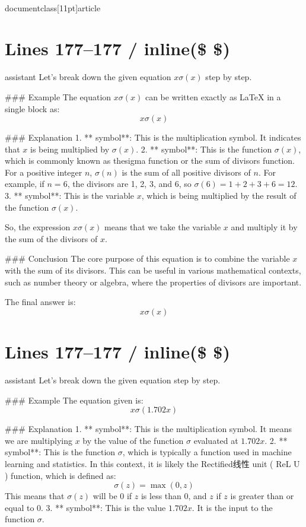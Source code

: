 \\documentclass[11pt]{article}
\begin{document}


\section*{Lines 177–177 / inline(\$ \$) }
assistant
Let's break down the given equation \( x \sigma(x) \) step by step.

### Example
The equation \( x \sigma(x) \) can be written exactly as LaTeX in a single block as:
\[ x \sigma(x) \]

### Explanation
1. ** symbol**: This is the multiplication symbol. It indicates that \( x \) is being multiplied by \( \sigma(x) \).
2. ** symbol**: This is the function \( \sigma(x) \), which is commonly known as thesigma function or the sum of divisors function. For a positive integer \( n \), \( \sigma(n) \) is the sum of all positive divisors of \( n \). For example, if \( n = 6 \), the divisors are 1, 2, 3, and 6, so \( \sigma(6) = 1 + 2 + 3 + 6 = 12 \).
3. ** symbol**: This is the variable \( x \), which is being multiplied by the result of the function \( \sigma(x) \).

So, the expression \( x \sigma(x) \) means that we take the variable \( x \) and multiply it by the sum of the divisors of \( x \).

### Conclusion
The core purpose of this equation is to combine the variable \( x \) with the sum of its divisors. This can be useful in various mathematical contexts, such as number theory or algebra, where the properties of divisors are important.

The final answer is:
\[ \boxed{x \sigma(x)} \]


\section*{Lines 177–177 / inline(\$ \$) }
assistant
Let's break down the given equation step by step.

### Example
The equation given is:
\[ x \sigma(1.702 x) \]

### Explanation
1. ** symbol**: This is the multiplication symbol. It means we are multiplying \( x \) by the value of the function \(\sigma\) evaluated at \(1.702 x\).
2. ** symbol**: This is the function \(\sigma\), which is typically a function used in machine learning and statistics. In this context, it is likely the Rectified线性 unit ( ReL U ) function, which is defined as:
   \[
   \sigma(z) = \max(0, z)
   \]
   This means that \(\sigma(z)\) will be 0 if \(z\) is less than 0, and \(z\) if \(z\) is greater than or equal to 0.
3. ** symbol**: This is the value \(1.702 x\). It is the input to the function \(\sigma\).
\end{document}
